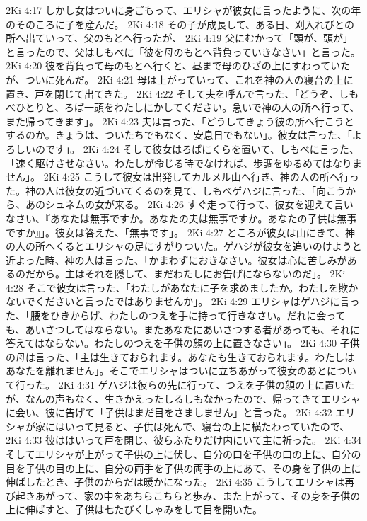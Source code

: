 2Ki 4:17  しかし女はついに身ごもって、エリシャが彼女に言ったように、次の年のそのころに子を産んだ。
2Ki 4:18  その子が成長して、ある日、刈入れびとの所へ出ていって、父のもとへ行ったが、
2Ki 4:19  父にむかって「頭が、頭が」と言ったので、父はしもべに「彼を母のもとへ背負っていきなさい」と言った。
2Ki 4:20  彼を背負って母のもとへ行くと、昼まで母のひざの上にすわっていたが、ついに死んだ。
2Ki 4:21  母は上がっていって、これを神の人の寝台の上に置き、戸を閉じて出てきた。
2Ki 4:22  そして夫を呼んで言った、「どうぞ、しもべひとりと、ろば一頭をわたしにかしてください。急いで神の人の所へ行って、また帰ってきます」。
2Ki 4:23  夫は言った、「どうしてきょう彼の所へ行こうとするのか。きょうは、ついたちでもなく、安息日でもない」。彼女は言った、「よろしいのです」。
2Ki 4:24  そして彼女はろばにくらを置いて、しもべに言った、「速く駆けさせなさい。わたしが命じる時でなければ、歩調をゆるめてはなりません」。
2Ki 4:25  こうして彼女は出発してカルメル山へ行き、神の人の所へ行った。神の人は彼女の近づいてくるのを見て、しもべゲハジに言った、「向こうから、あのシュネムの女が来る。
2Ki 4:26  すぐ走って行って、彼女を迎えて言いなさい、『あなたは無事ですか。あなたの夫は無事ですか。あなたの子供は無事ですか』」。彼女は答えた、「無事です」。
2Ki 4:27  ところが彼女は山にきて、神の人の所へくるとエリシャの足にすがりついた。ゲハジが彼女を追いのけようと近よった時、神の人は言った、「かまわずにおきなさい。彼女は心に苦しみがあるのだから。主はそれを隠して、まだわたしにお告げにならないのだ」。
2Ki 4:28  そこで彼女は言った、「わたしがあなたに子を求めましたか。わたしを欺かないでくださいと言ったではありませんか」。
2Ki 4:29  エリシャはゲハジに言った、「腰をひきからげ、わたしのつえを手に持って行きなさい。だれに会っても、あいさつしてはならない。またあなたにあいさつする者があっても、それに答えてはならない。わたしのつえを子供の顔の上に置きなさい」。
2Ki 4:30  子供の母は言った、「主は生きておられます。あなたも生きておられます。わたしはあなたを離れません」。そこでエリシャはついに立ちあがって彼女のあとについて行った。
2Ki 4:31  ゲハジは彼らの先に行って、つえを子供の顔の上に置いたが、なんの声もなく、生きかえったしるしもなかったので、帰ってきてエリシャに会い、彼に告げて「子供はまだ目をさましません」と言った。
2Ki 4:32  エリシャが家にはいって見ると、子供は死んで、寝台の上に横たわっていたので、
2Ki 4:33  彼ははいって戸を閉じ、彼らふたりだけ内にいて主に祈った。
2Ki 4:34  そしてエリシャが上がって子供の上に伏し、自分の口を子供の口の上に、自分の目を子供の目の上に、自分の両手を子供の両手の上にあて、その身を子供の上に伸ばしたとき、子供のからだは暖かになった。
2Ki 4:35  こうしてエリシャは再び起きあがって、家の中をあちらこちらと歩み、また上がって、その身を子供の上に伸ばすと、子供は七たびくしゃみをして目を開いた。
